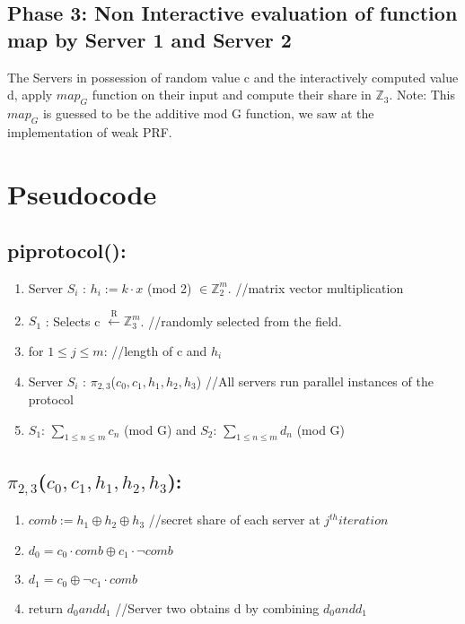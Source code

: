 \documentclass[11pt]{article}
\begin{document}
\subsection{Phase 3: Non Interactive evaluation of function map by Server 1 and Server 2}
The Servers in possession of random value c and the interactively computed value d, apply $map_{G}$ function on their input and compute their share in $\mathbb{Z}_3$. Note: This $map_{G}$ is guessed to be the additive mod G function, we saw at the implementation of weak PRF.

\section{Pseudocode}

\subsection{piprotocol():}
\begin{enumerate}
	\item Server $S_{i}$ : $h_{i}  := k \cdot x  $ (mod 2) $\in \mathbb{Z}_{2}^{m}$. //matrix vector multiplication
	\item $S_{1}$ : Selects c $\xleftarrow{\text{R}} \mathbb{Z}_{3}^{m}$. //randomly selected from the field.
	\item for $1 \leq j \leq m$: //length of c and $h_{i}$
	\item \quad Server $S_{i}$ : $\pi_{2,3}$($c_{0}, c_{1}, h_{1}, h_{2}, h_{3}$) //All servers run parallel instances of the protocol
	\item $S_{1}$: $\sum_{1 \leq n \leq m} c_{n} $ (mod G) and $S_{2}$: $\sum_{1 \leq n \leq m} d_{n} $ (mod G)
\end{enumerate}

\subsection{$\pi_{2,3}$($c_{0}, c_{1}, h_{1}, h_{2}, h_{3}$):}
\begin{enumerate}
	\item $comb := h_{1} \oplus h_{2} \oplus h_{3}$ //secret share of each server at $j^{th} iteration$
	\item $d_{0} = c_{0} \cdot comb \oplus c_{1} \cdot \neg comb$
	\item $d_{1} = c_{0} \oplus \neg c_{1} \cdot comb$
	\item return $d_{0} and d_{1}$ //Server two obtains d by combining $d_{0} and d_{1}$
\end{enumerate}
 
\end{document}
